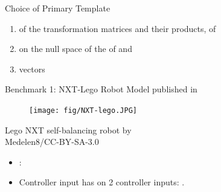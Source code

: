 \begin{frame}{Choice of Primary Template}
\begin{block}{}
\begin{enumerate}
\item {} of the transformation matrices and their products,  of 
\item  {}  on the null space of
   the  of  and   
\item  {} vectors
\end{enumerate}
\end{block}

\end{frame}



\begin{frame}{Benchmark 1: NXT-Lego Robot Model}
 published in  %

\begin{minipage}{0.3\textwidth}
\begin{figure}
\centering
\texttt{[image: fig/NXT-lego.JPG]}
\end{figure}
\end{minipage}
\begin{minipage}{0.6\textwidth}
{\footnotesize Lego NXT self-balancing robot by\\ Medelen8/CC-BY-SA-3.0}
\begin{itemize}
\item {}:
\item Controller input has  on {\color{violet} 2 controller inputs}: .
\end{itemize}
\end{minipage}

\end{frame}


